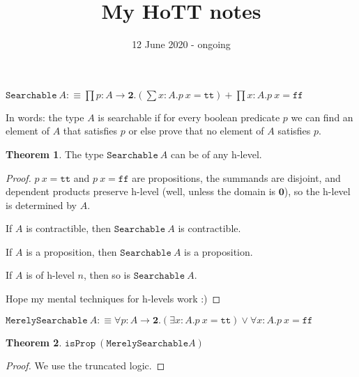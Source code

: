 \documentclass[11pt]{article}
\title{My HoTT notes}
\date{12 June 2020 - ongoing}
\theoremstyle{definition}
\newtheorem{theorem}{Theorem}[section]
\newcommand{\txt}[1]{\texttt{#1}}
\newcommand{\text}[1]{\texttt{#1}}
\renewcommand{\(}{\left(}
\renewcommand{\)}{\right)}
\newcommand{\defn}{:\equiv}
\newcommand{\isProp}{\text{isProp}}
\newcommand{\apl}[2]{#1\ #2}
\newcommand{\Empty}{\mathbf{0}}
\newcommand{\Bool}{\mathbf{2}}
\newcommand{\true}{\txt{tt}}
\newcommand{\false}{\txt{ff}}
\newcommand{\dprod}[2]{\prod #1.#2}
\newcommand{\dsum}[2]{\sum #1.#2}
\newcommand{\all}[2]{\forall #1.#2}
\newcommand{\ex}[2]{\exists #1.#2}
\begin{document}
\maketitle

\newcommand{\Searchable}{\txt{Searchable}}

\begin{center}
$\displaystyle \apl{\Searchable}{A} \defn \dprod{p : A \to \Bool}{\(\dsum{x : A}{\apl{p}{x} = \true}\) + \dprod{x : A}{\apl{p}{x} = \false}}$
\end{center}

In words: the type $A$ is searchable if for every boolean predicate $p$ we can find an element of $A$ that satisfies $p$ or else prove that no element of $A$ satisfies $p$.

\begin{theorem}
The type $\apl{\Searchable}{A}$ can be of any h-level.
\end{theorem}
\begin{proof}
$\apl{p}{x} = \true$ and $\apl{p}{x} = \false$ are propositions, the summands are disjoint, and dependent products preserve h-level (well, unless the domain is $\Empty$), so the h-level is determined by $A$.

If $A$ is contractible, then $\apl{\Searchable}{A}$ is contractible.

If $A$ is a proposition, then $\apl{\Searchable}{A}$ is a proposition.

If $A$ is of h-level $n$, then so is $\apl{\Searchable}{A}$.

Hope my mental techniques for h-levels work :)

\end{proof}

\newcommand{\MerelySearchable}{\txt{MerelySearchable}}
\begin{center}
$\displaystyle \apl{\MerelySearchable}{A} \defn \all{p : A \to \Bool}{\(\ex{x : A}{\apl{p}{x} = \true}\) \lor \all{x : A}{\apl{p}{x} = \false}}$
\end{center}

\begin{theorem}
$\apl{\isProp}{(\MerelySearchable{A})}$
\end{theorem}
\begin{proof}
We use the truncated logic.
\end{proof}
\end{document}
